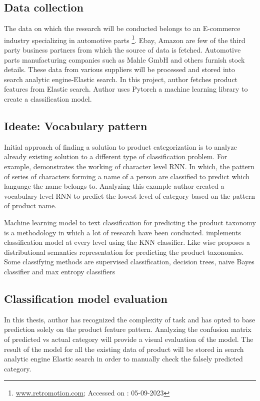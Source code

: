 \subsection{Data collection}
The data on which the research will be conducted belongs to an E-commerce industry specializing in automotive parts \footnote{\url{www.retromotion.com}; Accessed on : 05-09-2023}. Ebay, Amazon are few of the third party business partners from which the source of data is fetched. Automotive parts manufacturing companies such as Mahle GmbH and others furnish stock details. These data from various suppliers will be processed and stored into search analytic engine-Elastic search. In this project, author fetches product features from Elastic search. Author uses Pytorch a machine learning library to create a classification model.


\subsection{Ideate: Vocabulary pattern}
Initial approach of finding a solution to product categorization is to analyze already existing solution to a different type of classification problem. For example, \parencite{sean} demonstrates the working of character level RNN. In which, the pattern of series of characters forming a name of a person are classified to predict which language the name belongs to. Analyzing this example author created a vocabulary level RNN to predict the lowest level of category based on the pattern of product name.

Machine learning model to text classification for predicting the product taxonomy is a methodology in which a lot of research have been conducted. \cite{AliCevahir.} implements classification model at every level using the \acl*{KNN} classifier. Like wise \parencite{Gupta.20062016}  proposes a distributional semantics representation for predicting the product taxonomies.  Some classifying methods are supervised classification, decision trees, naive Bayes classifier and max entropy classifiers \parencite{BirdKleinLoper09}

\subsection{Classification model evaluation}

In this thesis, author has recognized the complexity of task and has opted to base prediction solely on the product feature pattern. Analyzing the confusion matrix of predicted vs actual category will provide a visual evaluation of the model. The result of the model for all the existing data of product will be stored in search analytic engine Elastic search in order to manually check the falsely predicted category.

